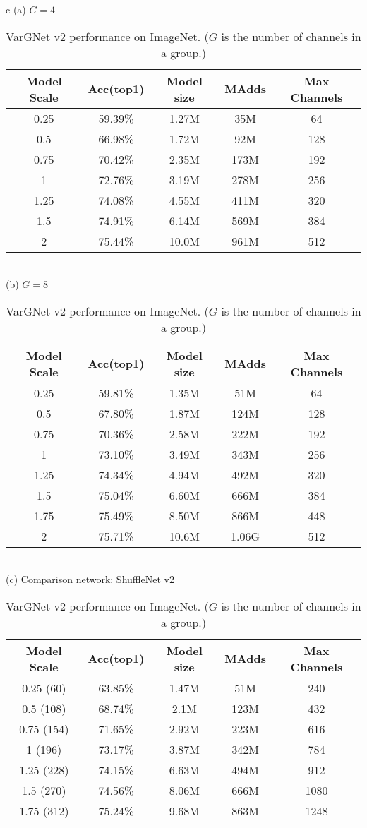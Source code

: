 \documentclass{article}
\begin{document}
\begin{table}
  \centering
  \caption{VarGNet v2 performance on ImageNet. ($G$ is the number of channels in a group.)}\label{tab:vargnetv2_comp}
  \begin{tabular}{c}
    (a) $G=4$ \\
    \begin{tabular}{ccccc}
      \toprule
      Model Scale & Acc(top1) & Model size & MAdds & Max Channels \\ \midrule
      0.25 & 59.39\% & 1.27M & 35M & 64 \\
      0.5 & 66.98\% & 1.72M & 92M & 128 \\
      0.75 & 70.42\% & 2.35M & 173M & 192 \\
      1 & 72.76\% & 3.19M & 278M & 256 \\
      1.25 & 74.08\% & 4.55M & 411M & 320 \\
      1.5 & 74.91\% & 6.14M & 569M & 384 \\
      2 & 75.44\% & 10.0M & 961M & 512 \\
      \bottomrule
    \end{tabular} \\
    (b) $G=8$ \\
    \begin{tabular}{ccccc}
      \toprule
      Model Scale & Acc(top1) & Model size & MAdds & Max Channels \\ \midrule
      0.25 & 59.81\% & 1.35M & 51M & 64 \\
      0.5 & 67.80\% & 1.87M & 124M & 128 \\
      0.75 & 70.36\% & 2.58M & 222M & 192 \\
      1 & 73.10\% & 3.49M & 343M & 256 \\
      1.25 & 74.34\% & 4.94M & 492M & 320 \\
      1.5 & 75.04\% & 6.60M & 666M & 384 \\
      1.75 & 75.49\% & 8.50M & 866M & 448 \\
      2 & 75.71\% & 10.6M & 1.06G & 512 \\
      \bottomrule
    \end{tabular} \\
    (c) Comparison network: ShuffleNet v2\\
    \begin{tabular}{ccccc}
      \toprule
      Model Scale & Acc(top1) & Model size & MAdds & Max Channels \\ \midrule
      0.25 (60) & 63.85\% & 1.47M & 51M & 240 \\
      0.5 (108) & 68.74\% & 2.1M & 123M & 432 \\
      0.75 (154) & 71.65\% & 2.92M & 223M & 616 \\
      1 (196) & 73.17\% & 3.87M & 342M & 784 \\
      1.25 (228) & 74.15\% & 6.63M & 494M & 912 \\
      1.5 (270) & 74.56\% & 8.06M & 666M & 1080 \\
      1.75 (312) & 75.24\% & 9.68M & 863M & 1248 \\
      \bottomrule
    \end{tabular}
  \end{tabular}
\end{table}
\end{document}
